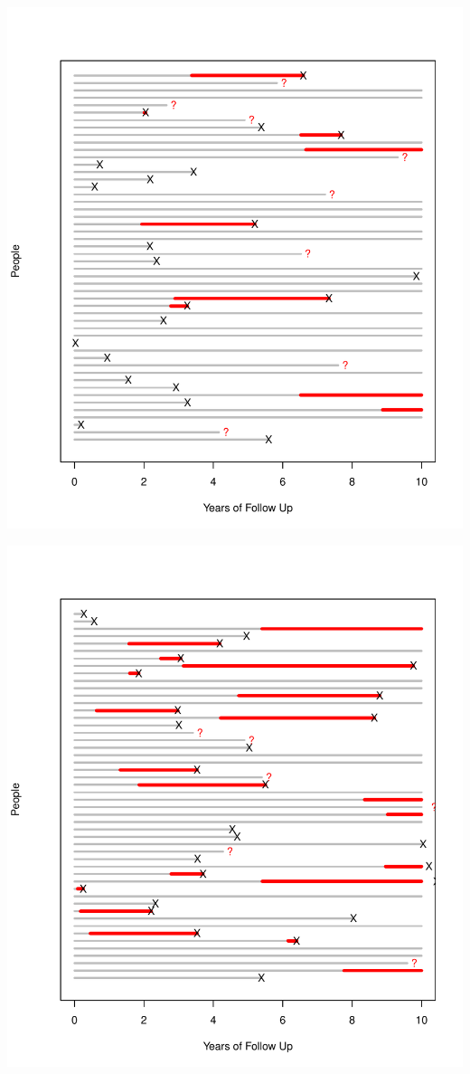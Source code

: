\documentclass{article}
\begin{document}
\includegraphics{incidence-graphs-nine}

\includegraphics{incidence-graphs-ten}
\end{document}
